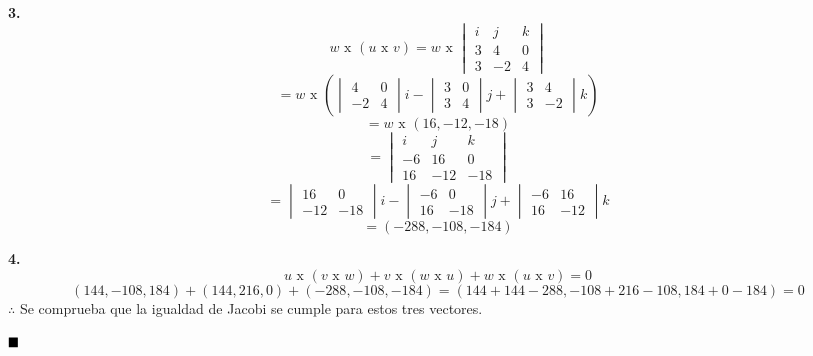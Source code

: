 \documentclass{article}
\begin{document}
    \textbf{3.}
    $$w \text{ x }(u \text{ x } v) = w \text{ x } \begin{vmatrix}
        i & j & k \\
        3 & 4 & 0 \\
        3 & -2 & 4
    \end{vmatrix}$$
    $$= w \text{ x } \left(\begin{vmatrix}
        4 & 0 \\
        -2 & 4 
    \end{vmatrix}i - \begin{vmatrix}
        3 & 0 \\
        3 & 4 
    \end{vmatrix}j+ \begin{vmatrix}
        3 & 4 \\
        3 & -2 
    \end{vmatrix}k\right)$$
    $$= w \text{ x }(16, -12, -18)$$
    $$= \begin{vmatrix}
        i & j & k \\
        -6 & 16 & 0 \\
        16 & -12 & -18
    \end{vmatrix}$$
    $$= \begin{vmatrix}
        16 & 0 \\
        -12 & -18
    \end{vmatrix}i- \begin{vmatrix}
        -6 & 0 \\
        16 & -18
    \end{vmatrix}j + \begin{vmatrix}
        -6 & 16 \\
        16 & -12
    \end{vmatrix}k$$
    $$ =(-288, -108, -184)$$

    \textbf{4.}
    $$u \text{ x }(v \text{ x } w) + v \text{ x }(w \text{ x } u) + w \text{ x }(u \text{ x } v) = 0$$
    $$(144, -108, 184)+ (144, 216, 0)+ (-288, -108, -184) = (144+144-288, -108+216-108, 184+0-184) = 0$$
    $\therefore$ Se comprueba que la igualdad de Jacobi se cumple para estos tres vectores.
    
    $\hfill\blacksquare$
\end{document}
